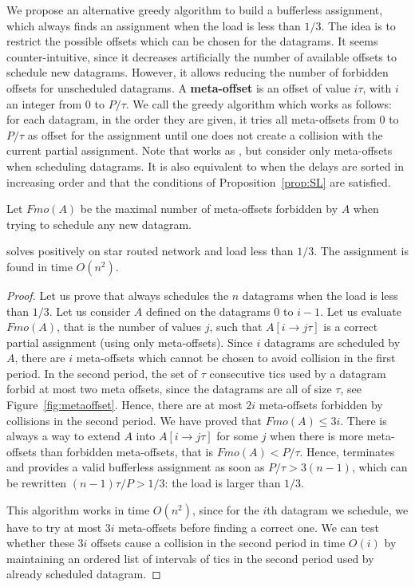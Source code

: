      We propose an alternative greedy algorithm to build a bufferless assignment, which always finds an assignment when the load is less than $1/3$.  
     The idea is to restrict the possible offsets which can be chosen for the datagrams. It seems counter-intuitive, since it decreases artificially the number of available offsets to schedule new datagrams. However, it allows reducing the number of forbidden offsets for unscheduled datagrams. A \textbf{meta-offset} is an offset of value $i\tau$, with $i$ an integer from $0$ to $P / \tau$. We call \metaoffset the greedy algorithm which works as follows: for each datagram, in the order they are given, it tries all meta-offsets from $0$ to $P/\tau$ as offset for the assignment until one does not create a collision with the current partial assignment. Note that \metaoffset works as \firstfit, but consider only meta-offsets when scheduling datagrams. It is also equivalent to \shortestlongest when the delays are sorted in increasing order and that the conditions of Proposition~\ref{prop:SL} are satisfied.

     Let $Fmo(A)$ be the maximal number of meta-offsets forbidden by $A$ when trying to schedule any new datagram. 



\begin{theorem}
\metaoffset solves \pma positively on star routed network and load less than $1/3$. 
The assignment is found in time $O(n^2)$.
\end{theorem}
    \begin{proof}
    Let us prove that \metaoffset always schedules the $n$ datagrams when the load is less than $1/3$. Let us consider $A$ defined on the datagrams $0$ to $i-1$. Let us evaluate $Fmo(A)$, that is the number of values $j$, such that $A[i \rightarrow j\tau]$ is a correct partial assignment (using only meta-offsets).
    Since $i$ datagrams are scheduled by $A$, there are $i$ meta-offsets which cannot be chosen to avoid collision in the 
    first period. In the second period, the set of $\tau$ consecutive tics used by a datagram forbid at most two meta offsets, since the datagrams are all of size $\tau$, see Figure~\ref{fig:metaoffset}.  Hence, there are at most $2i$ meta-offsets forbidden by collisions in the second period. We have proved that $Fmo(A) \leq  3i$. There is always a way to extend $A$ into $A[i \rightarrow j\tau]$ for some $j$ when there is more meta-offsets than forbidden meta-offsets, that is $Fmo(A) < P/\tau$. Hence, \metaoffset terminates and provides a valid bufferless assignment as soon as $P/\tau > 3(n-1)$, which can be rewritten $(n-1)\tau /P > 1/3$: the load is larger than $1/3$.

     This algorithm works in time $O(n^2)$, since for the $i$th datagram we schedule, we have to try at most $3i$ meta-offsets before finding a correct one. We can test whether these $3i$ offsets cause a collision in the second period in time $O(i)$ by maintaining an ordered list of intervals of tics in the second period used by already scheduled datagram.
     \end{proof}
         
